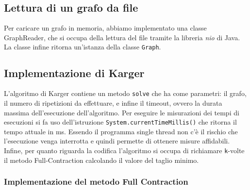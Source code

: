 \subsection{Lettura di un grafo da file}
Per caricare un grafo in memoria, abbiamo implementato una classe GraphReader, 
che si occupa della lettura del file tramite la libreria \textit{nio} di Java. 
La classe infine ritorna un'istanza della classe \texttt{Graph}.
\subsection{Implementazione di Karger}
L'algoritmo di Karger contiene un metodo \texttt{solve} che ha come parametri: il grafo, 
il numero di ripetizioni da effettuare, e infine il timeout, ovvero la durata massima 
dell'esecuzione dell'algoritmo.
Per eseguire le misurazioni dei tempi di esecuzioni si fa uso dell'istruzione 
\texttt{System.currentTimeMillis()} che ritorna il tempo attuale in ms. 
Essendo il programma single thread non c'è il rischio che l'esecuzione venga interrotta e 
quindi permette di ottenere misure affidabili. 
Infine, per quanto riguarda la codifica l'algoritmo si occupa di richiamare \texttt{k}-volte
il metodo Full-Contraction calcolando il valore del taglio minimo.
\subsubsection{Implementazione del metodo Full Contraction}